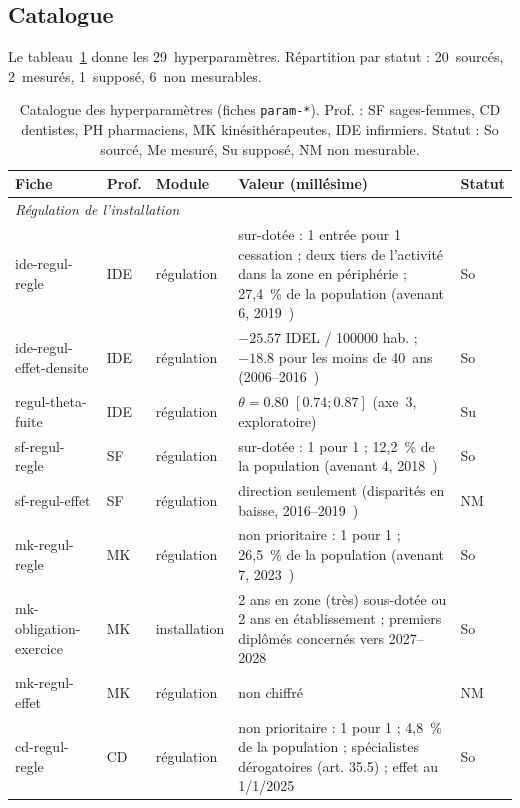 \documentclass[11pt]{article}
\begin{document}
\subsection{Catalogue}

Le tableau~\ref{tab:catalogue} donne les 29~hyperparamètres. Répartition
par statut : 20~sourcés, 2~mesurés, 1~supposé, 6~non mesurables.

\begin{table}[p]
\centering\scriptsize
\caption{Catalogue des hyperparamètres (fiches \texttt{param-*}). Prof. : SF sages-femmes, CD dentistes, PH pharmaciens, MK kinésithérapeutes, IDE infirmiers. Statut : So sourcé, Me mesuré, Su supposé, NM non mesurable.}\label{tab:catalogue}
\begin{tabular}{p{2.6cm}p{1.1cm}p{1.6cm}p{6.6cm}p{0.5cm}}
\toprule
Fiche & Prof. & Module & Valeur (millésime) & Statut \\
\midrule
\multicolumn{5}{l}{\emph{Régulation de l'installation}} \\
ide-regul-regle & IDE & régulation & sur-dotée : 1 entrée pour 1 cessation ; deux tiers de l'activité dans la zone en périphérie ; 27,4~\%\derive{} de la population (avenant 6, 2019~\cite{avenant6ide}) & So \\
ide-regul-effet-densite & IDE & régulation & $\num{-25.57}$ IDEL / \num{100000} hab. ; $\num{-18.8}$ pour les moins de 40~ans (2006--2016~\cite{irdes270}) & So \\
regul-theta-fuite & IDE & régulation & $\theta = \num{0.80}$ $[\num{0.74} ; \num{0.87}]$\suppose{} (axe~3, exploratoire) & Su \\
sf-regul-regle & SF & régulation & sur-dotée : 1 pour 1 ; 12,2~\%\derive{} de la population (avenant 4, 2018~\cite{avenant4sf}) & So \\
sf-regul-effet & SF & régulation & direction seulement (disparités en baisse, 2016--2019~\cite{igas2023}) & NM \\
mk-regul-regle & MK & régulation & non prioritaire : 1 pour 1 ; 26,5~\%\derive{} de la population (avenant 7, 2023~\cite{avenant7mk}) & So \\
mk-obligation-exercice & MK & installation & 2 ans en zone (très) sous-dotée ou 2 ans en établissement ; premiers diplômés concernés vers 2027--2028\derive{}~\cite{avenant7mk} & So \\
mk-regul-effet & MK & régulation & non chiffré & NM \\
cd-regul-regle & CD & régulation & non prioritaire : 1 pour 1 ; 4,8~\%\derive{} de la population ; spécialistes dérogatoires (art. 35.5) ; effet au 1/1/2025~\cite{conventioncd2023} & So \\

\end{tabular}
\end{table}
\end{document}
